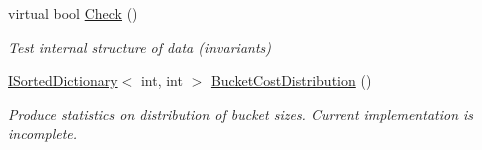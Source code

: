\begin{DoxyCompactItemize}
virtual bool \hyperlink{class_c5_1_1_hash_set_a7000a1b6fea242f1f5ca40571724b309}{Check} ()
\begin{DoxyCompactList}\small\item\em Test internal structure of data (invariants) \end{DoxyCompactList}\item 
\hyperlink{interface_c5_1_1_i_sorted_dictionary}{I\+Sorted\+Dictionary}$<$ int, int $>$ \hyperlink{class_c5_1_1_hash_set_aa85358a09cbd7316bfad33a79dbc69e4}{Bucket\+Cost\+Distribution} ()
\begin{DoxyCompactList}\small\item\em Produce statistics on distribution of bucket sizes. Current implementation is incomplete. \end{DoxyCompactList}\end{DoxyCompactItemize}
